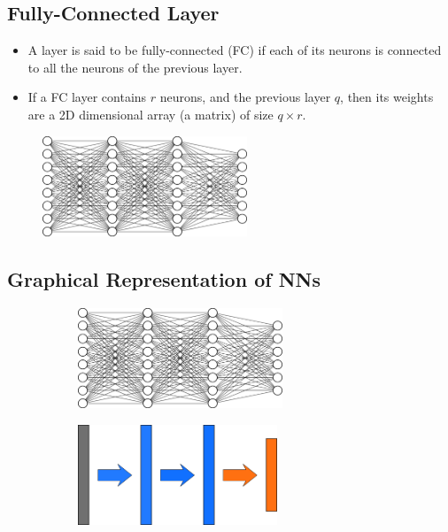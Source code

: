 \documentclass{book}
\begin{document}
\subsection{Fully-Connected Layer}

\begin{itemize}
\item A layer is said to be fully-connected (FC) if each of its neurons is connected to all the neurons of the previous layer.
\item If a FC layer contains $r$ neurons, and the previous layer $q$, then its weights are a 2D dimensional array (a matrix) of size $q \times r$.
\end{itemize}

\begin{figure}[h]
    \centering
    \includegraphics[height=3cm]{mini_reseau3_bis}
\end{figure}

\subsection{Graphical Representation of NNs}

\begin{figure}[h]
    \centering
    \begin{subfigure}{.5\textwidth}
        \includegraphics[height=3cm]{mini_reseau3_bis}
    \end{subfigure}
    \begin{subfigure}{.5\textwidth}
        \includegraphics[height=3cm]{nn_representation3}
    \end{subfigure}
\end{figure}
\end{document}
